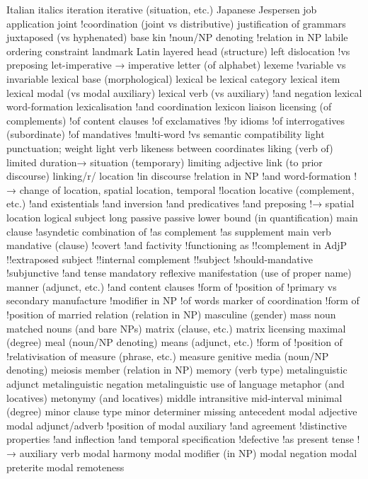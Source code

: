 Italian
italics
iteration
iterative (situation, etc.)
Japanese
Jespersen
job application
joint
!coordination (joint vs distributive)
justification of grammars
juxtaposed (vs hyphenated) base
kin
!noun/NP denoting
!relation in NP
labile ordering constraint
landmark
Latin
layered head (structure)
left dislocation
!vs preposing
let-imperative → imperative
letter (of alphabet)
lexeme
!variable vs invariable
lexical base (morphological)
lexical be
lexical category
lexical item
lexical modal (vs modal auxiliary)
lexical verb (vs auxiliary)
!and negation
lexical word-formation
lexicalisation
!and coordination
lexicon
liaison
licensing (of complements)
!of content clauses
!of exclamatives
!by idioms
!of interrogatives (subordinate)
!of mandatives
!multi-word
!vs semantic compatibility
light punctuation; weight
light verb
likeness between coordinates
liking (verb of)
limited duration→ situation (temporary)
limiting adjective
link (to prior discourse)
linking/r/
location
!in discourse
!relation in NP
!and word-formation
!→ change of location, spatial location, temporal
!location
locative (complement, etc.)
!and existentials
!and inversion
!and predicatives
!and preposing
!→ spatial location
logical subject
long passive passive
lower bound (in quantification)
main clause
!asyndetic combination of
!as complement
!as supplement
main verb
mandative (clause)
!covert
!and factivity
!functioning as
!!complement in AdjP
!!extraposed subject
!!internal complement
!!subject
!should-mandative
!subjunctive
!and tense
mandatory reflexive
manifestation (use of proper name)
manner (adjunct, etc.)
!and content clauses
!form of
!position of
!primary vs secondary
manufacture
!modifier in NP
!of words
marker of coordination
!form of
!position of
married relation (relation in NP)
masculine (gender)
mass noun
matched nouns (and bare NPs)
matrix (clause, etc.)
matrix licensing
maximal (degree)
meal (noun/NP denoting)
means (adjunct, etc.)
!form of
!position of
!relativisation of
measure (phrase, etc.)
measure genitive
media (noun/NP denoting)
meiosis
member (relation in NP)
memory (verb type)
metalinguistic adjunct
metalinguistic negation
metalinguistic use of language
metaphor (and locatives)
metonymy (and locatives)
middle intransitive
mid-interval
minimal (degree)
minor clause type
minor determiner
missing antecedent
modal adjective
modal adjunct/adverb
!position of
modal auxiliary
!and agreement
!distinctive properties
!and inflection
!and temporal specification
!defective
!as present tense
!→ auxiliary verb
modal harmony
modal modifier (in NP)
modal negation
modal preterite
modal remoteness
